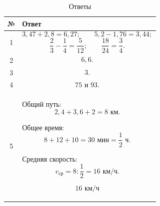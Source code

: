 \documentclass[a4paper,12pt]{article}
\begin{document}
\begin{table}[ht]
\centering
\caption{Ответы}
\renewcommand{\arraystretch}{1.55}
\begin{tabularx}{\linewidth}{@{}cX@{}}
\toprule
\textbf{№} & \textbf{Ответ}\\
\midrule

1 &
\[
3{,}47+2{,}8=6{,}27;
\qquad
5{,}2-1{,}76=3{,}44;
\]
\[
\frac23-\frac14=\frac5{12};
\qquad
\frac{18}{24}=\frac34.
\]
\\

2 &
\[
6{,}6.
\]
\\

3 &
\[
3.
\]
\\

4 &
\[
75\text{ и }93.
\]
\\

5 &
Общий путь:
\[
2{,}4+3{,}6+2=8\text{ км}.
\]

Общее время:
\[
8+12+10=30\text{ мин}
=
\frac12\text{ ч}.
\]

Средняя скорость:
\[
v_{\text{ср}}
=
8:\frac12
=
16\text{ км/ч}.
\]

\[
\boxed{16\text{ км/ч}}
\]
\\

\bottomrule
\end{tabularx}
\end{table}

\vfill
\end{document}
